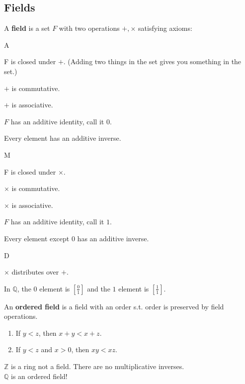 \documentclass[../main.tex]{subfiles}
\begin{document}

\subsection{Fields}

\begin{definition}[Field]
    A \textbf{field} is a set \( F \) with two operations \( +, \times \) satisfying axioms:
    \begin{axioms}{A}
        \item F is closed under \( + \). (Adding two things in the set gives you something in the set.)
        \item \( + \) is commutative.
        \item \( + \) is associative.
        \item \( F \) has an additive identity, call it 0.
        \item Every element has an additive inverse.
    \end{axioms}
    \begin{axioms}{M}
        \item F is closed under \( \times \).
        \item \( \times \) is commutative.
        \item \( \times \) is associative.
        \item \( F \) has an additive identity, call it \( 1 \).
        \item Every element except \( 0 \) has an additive inverse.
    \end{axioms}
    \begin{axioms}{D}
        \item \( \times \) distributes over \( + \).
    \end{axioms}
\end{definition}

\begin{example}[]
    In \( \mathbb{Q} \), the \( 0 \) element is \( \displaystyle \left[ \frac{0}{1} \right]\)
    and the \( 1 \) element is \( \displaystyle \left[ \frac{1}{1} \right] \).
\end{example}

\begin{definition}
    An \textbf{ordered field} is a field with an order s.t. order is preserved by field operations.
    \begin{enumerate}
        \item If \( y<z \), then \( x+y <x+z \).
        \item If \( y<z \) and \( x>0 \), then \( xy<xz \).
    \end{enumerate}
\end{definition}

\begin{note}
    \( \mathbb{Z} \) is a ring not a field. There are no multiplicative inverses. \\
    \( \mathbb{Q} \) is an ordered field!
\end{note}
\end{document}
